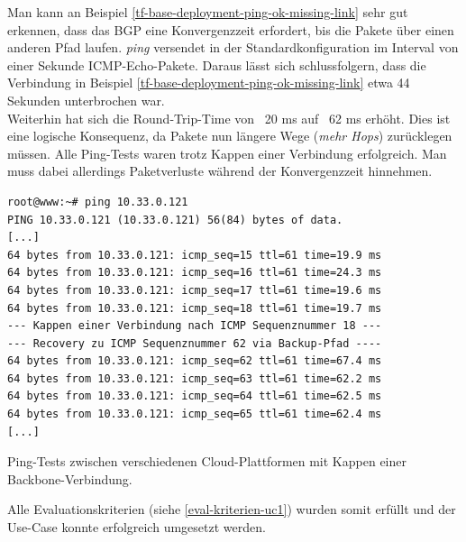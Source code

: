 Man kann an Beispiel \ref{tf-base-deployment-ping-ok-missing-link} sehr gut erkennen, dass das BGP eine Konvergenzzeit erfordert, bis die Pakete über einen anderen Pfad laufen. \textit{ping} versendet in der Standardkonfiguration im Interval von einer Sekunde ICMP-Echo-Pakete. Daraus lässt sich schlussfolgern, dass die Verbindung in Beispiel \ref{tf-base-deployment-ping-ok-missing-link} etwa 44 Sekunden unterbrochen war.\\
Weiterhin hat sich die Round-Trip-Time von ~20 ms auf ~62 ms erhöht. Dies ist eine logische Konsequenz, da Pakete nun längere Wege (\textit{mehr Hops}) zurücklegen müssen. Alle Ping-Tests waren trotz Kappen einer Verbindung erfolgreich. Man muss dabei allerdings Paketverluste während der Konvergenzzeit hinnehmen.
\begin{listing}[h]
\begin{verbatim}
root@www:~# ping 10.33.0.121
PING 10.33.0.121 (10.33.0.121) 56(84) bytes of data.
[...]
64 bytes from 10.33.0.121: icmp_seq=15 ttl=61 time=19.9 ms
64 bytes from 10.33.0.121: icmp_seq=16 ttl=61 time=24.3 ms
64 bytes from 10.33.0.121: icmp_seq=17 ttl=61 time=19.6 ms
64 bytes from 10.33.0.121: icmp_seq=18 ttl=61 time=19.7 ms 
--- Kappen einer Verbindung nach ICMP Sequenznummer 18 ---
--- Recovery zu ICMP Sequenznummer 62 via Backup-Pfad ----
64 bytes from 10.33.0.121: icmp_seq=62 ttl=61 time=67.4 ms
64 bytes from 10.33.0.121: icmp_seq=63 ttl=61 time=62.2 ms
64 bytes from 10.33.0.121: icmp_seq=64 ttl=61 time=62.5 ms
64 bytes from 10.33.0.121: icmp_seq=65 ttl=61 time=62.4 ms
[...]
\end{verbatim}
\caption{Ping-Tests zwischen verschiedenen Cloud-Plattformen mit Kappen einer Backbone-Verbindung.}
\label{tf-base-deployment-ping-ok-missing-link}
\end{listing}\FloatBarrier
Alle Evaluationskriterien (siehe \ref{eval-kriterien-uc1}) wurden somit erfüllt und der Use-Case konnte erfolgreich umgesetzt werden.